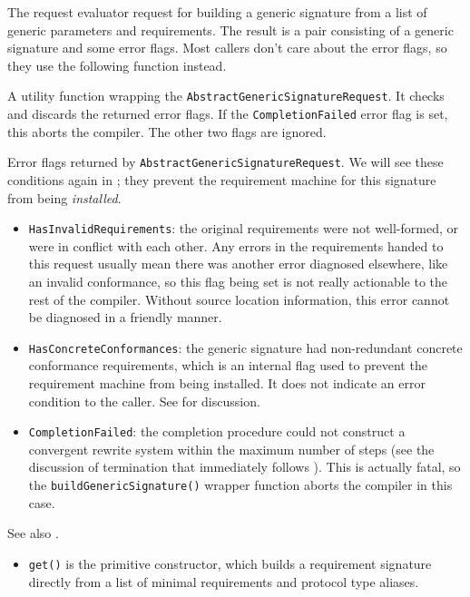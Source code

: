 \documentclass[../generics]{subfiles}
\begin{document}
The request evaluator request for building a generic signature from a list of generic parameters and requirements. The result is a pair consisting of a generic signature and some error flags. Most callers don't care about the error flags, so they use the following function instead.

A utility function wrapping the \texttt{AbstractGenericSignatureRequest}. It checks and discards the returned error flags. If the \texttt{CompletionFailed} error flag is set, this aborts the compiler. The other two flags are ignored.

Error flags returned by \texttt{AbstractGenericSignatureRequest}. We will see these conditions again in ; they prevent the requirement machine for this signature from being \emph{installed}.
\begin{itemize}
\item \texttt{HasInvalidRequirements}: the original requirements were not well-formed, or were in conflict with each other. Any errors in the requirements handed to this request usually mean there was another error diagnosed elsewhere, like an invalid conformance, so this flag being set is not really actionable to the rest of the compiler. Without source location information, this error cannot be diagnosed in a friendly manner.
\item \texttt{HasConcreteConformances}: the generic signature had non-redundant concrete conformance requirements, which is an internal flag used to prevent the requirement machine from being installed. It does not indicate an error condition to the caller. See  for discussion.
\item \texttt{CompletionFailed}: the completion procedure could not construct a convergent rewrite system within the maximum number of steps (see the discussion of termination that immediately follows ). This is actually fatal, so the \texttt{buildGenericSignature()} wrapper function aborts the compiler in this case.
\end{itemize}

See also .
\begin{itemize}
\item \texttt{get()} is the primitive constructor, which builds a requirement signature directly from a list of minimal requirements and protocol type aliases.
\end{itemize}
\end{document}

